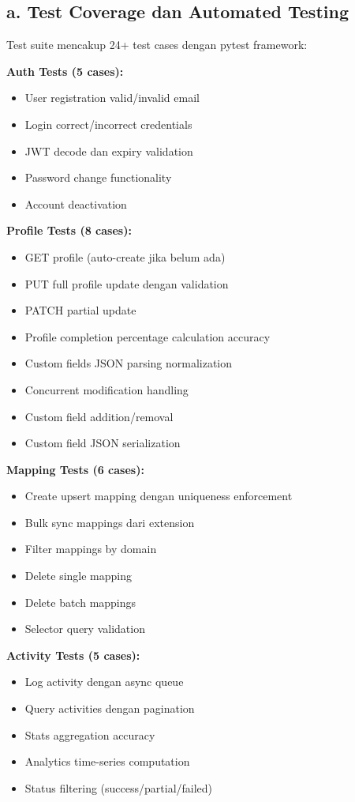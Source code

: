 \documentclass[12pt,a4paper]{article}
\begin{document}
\subsection*{a. Test Coverage dan Automated Testing}

Test suite mencakup 24+ test cases dengan pytest framework:

\textbf{Auth Tests (5 cases):}
\begin{itemize}
  \item User registration valid/invalid email
  \item Login correct/incorrect credentials
  \item JWT decode dan expiry validation
  \item Password change functionality
  \item Account deactivation
\end{itemize}

\textbf{Profile Tests (8 cases):}
\begin{itemize}
  \item GET profile (auto-create jika belum ada)
  \item PUT full profile update dengan validation
  \item PATCH partial update
  \item Profile completion percentage calculation accuracy
  \item Custom fields JSON parsing normalization
  \item Concurrent modification handling
  \item Custom field addition/removal
  \item Custom field JSON serialization
\end{itemize}

\textbf{Mapping Tests (6 cases):}
\begin{itemize}
  \item Create upsert mapping dengan uniqueness enforcement
  \item Bulk sync mappings dari extension
  \item Filter mappings by domain
  \item Delete single mapping
  \item Delete batch mappings
  \item Selector query validation
\end{itemize}

\textbf{Activity Tests (5 cases):}
\begin{itemize}
  \item Log activity dengan async queue
  \item Query activities dengan pagination
  \item Stats aggregation accuracy
  \item Analytics time-series computation
  \item Status filtering (success/partial/failed)
\end{itemize}
\end{document}

